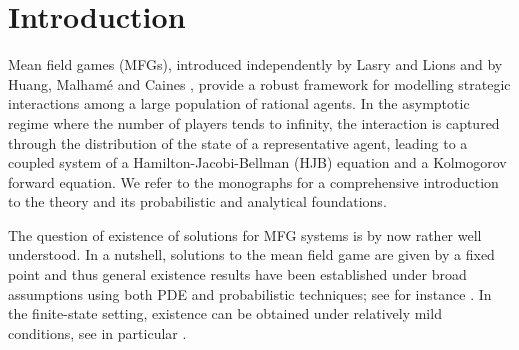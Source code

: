 \documentclass[11pt,a4paper]{amsart}
\theoremstyle{definition}
\begin{document}
	\date{April 18, 2026}
	
	
	\begin{abstract}
		We study a class of continuous-time mean field games on a finite state space with transition rates depending on the population distribution, leading to a non-separable Hamiltonian. In this setting, classical Lasry--Lions monotonicity arguments do not apply directly.
		We establish a new uniqueness result on arbitrary time horizons under a combination of strong monotonicity assumptions on the costs and quantitative bounds on the interaction term in the dynamics. 
	
	\end{abstract}

	

\maketitle



\section{Introduction}






Mean field games (MFGs), introduced independently by Lasry and Lions \cite{LasryLions} and by Huang, Malham\'e and Caines \cite{Huang2006}, provide a robust framework for modelling strategic interactions among a large population of rational agents. In the asymptotic regime where the number of players tends to infinity, the interaction is captured through the distribution of the state of a representative agent, leading to a coupled system of a Hamilton-Jacobi-Bellman (HJB) equation and a Kolmogorov forward equation. We refer to the monographs \cite{CardaliaguetDelarueLasryLions, CarmonaDelarue_book_I, CarmonaDelarue_book_II} for a comprehensive introduction to the theory and its probabilistic and analytical foundations.

The question of existence of solutions for MFG systems is by now rather well understood. In a nutshell, solutions to the mean field game are given by a fixed point and thus general existence results have been established under broad assumptions using both PDE and probabilistic techniques; see for instance \cite{CarmonaDelarue_book_I, lacker2015mean}. In the finite-state setting, existence can be obtained under relatively mild conditions, see in particular \cite{CecchinFischer}. 
\end{document}
